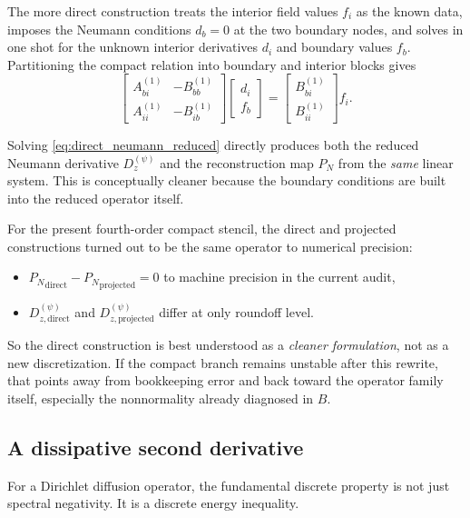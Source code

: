\documentclass[11pt]{article}
\newcommand{\Pmat}{P_N}
\begin{document}
The more direct construction treats the interior field values $f_i$ as the
known data, imposes the Neumann conditions $d_b = 0$ at the two boundary nodes,
and solves in one shot for the unknown interior derivatives $d_i$ and boundary
values $f_b$. Partitioning the compact relation into boundary and interior
blocks gives
\begin{equation}
\begin{bmatrix}
A^{(1)}_{bi} & -B^{(1)}_{bb} \\
A^{(1)}_{ii} & -B^{(1)}_{ib}
\end{bmatrix}
\begin{bmatrix}
d_i \\ f_b
\end{bmatrix}
=
\begin{bmatrix}
B^{(1)}_{bi} \\ B^{(1)}_{ii}
\end{bmatrix}
f_i.
\label{eq:direct_neumann_reduced}
\end{equation}

Solving \eqref{eq:direct_neumann_reduced} directly produces both the reduced
Neumann derivative $D_z^{(\psi)}$ and the reconstruction map $\Pmat$ from the
\emph{same} linear system. This is conceptually cleaner because the boundary
conditions are built into the reduced operator itself.

For the present fourth-order compact stencil, the direct and projected
constructions turned out to be the same operator to numerical precision:
\begin{itemize}[nosep]
\item ${\Pmat}_{\mathrm{direct}} - {\Pmat}_{\mathrm{projected}} = 0$ to machine
  precision in the current audit,
\item $D_{z,\mathrm{direct}}^{(\psi)}$ and
  $D_{z,\mathrm{projected}}^{(\psi)}$ differ at only roundoff level.
\end{itemize}

So the direct construction is best understood as a \emph{cleaner formulation},
not as a new discretization. If the compact branch remains unstable after this
rewrite, that points away from bookkeeping error and back toward the operator
family itself, especially the nonnormality already diagnosed in $B$.

\subsection{A dissipative second derivative}

For a Dirichlet diffusion operator, the fundamental discrete property is not
just spectral negativity. It is a discrete energy inequality.
\end{document}
